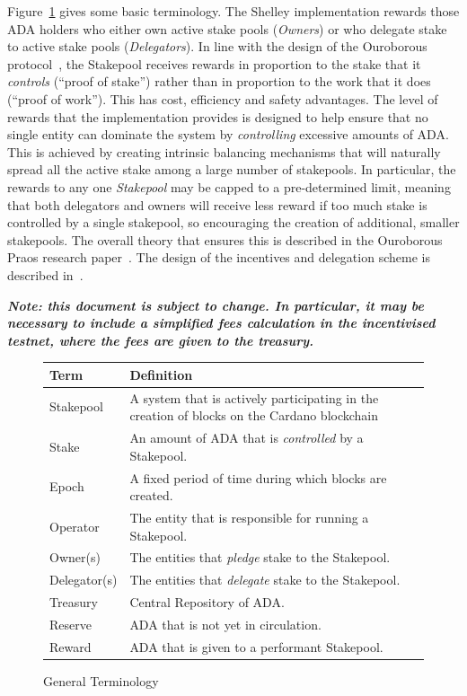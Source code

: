 \documentclass[11pt,a4paper,dvipsnames,twosided,final]{article}
\newcommand{\khcomment}[1]{\todo[color=blue!20]{KH: #1}}
\newcommand{\ada}{ADA{}}
\newcommand{\cardano}[1]{Cardano}
\begin{document}
Figure~\ref{fig:terminology} gives some basic terminology.
The Shelley implementation rewards those \ada{} holders who either own active stake pools
(\emph{Owners}) or who delegate stake to active stake pools (\emph{Delegators}).
In line with the design of the Ouroborous protocol~\cite{ouroboros_classic}, the Stakepool receives
rewards in proportion to the stake that it \emph{controls} (``proof of
stake'') rather than in proportion to the work that it does (``proof of work'').
This has cost, efficiency and safety advantages.
The level of rewards that the implementation provides is designed to help ensure that no single entity can
dominate the system by \emph{controlling} excessive amounts of \ada{}.  This is achieved by creating intrinsic
balancing mechanisms that will naturally spread all the active stake among a large number of stakepools.
In particular, the rewards to any one \emph{Stakepool} may be capped to a pre-determined limit,
meaning that both delegators and owners will receive less reward if too much stake is controlled by a single stakepool,
so encouraging the creation of additional, smaller stakepools.
The overall theory that ensures this is described in the Ouroborous Praos research
paper~\cite{ouroboros_praos}. The design of the incentives and delegation scheme is described
in~\cite{delegation_design}.

\textbf{\emph{Note: this document is subject to change.  In particular, it may be necessary to include a simplified fees calculation
  in the incentivised testnet, where the fees are given to the treasury\khcomment{Check fees.}.}}

\begin{figure}[t]
  \begin{center}
\begin{tabular}{||l|p{12cm}||}
  \hline \hline
\textbf{Term} & \textbf{Definition} \\\hline
  Stakepool & A system that is actively participating in the creation of blocks on the \cardano{} blockchain  \\\hline
  Stake & An amount of \ada{} that is \emph{controlled} by a Stakepool.\\\hline
  Epoch & A fixed period of time during which blocks are created.\\\hline
Operator & The entity that is responsible for running a Stakepool. \\\hline
Owner(s) & The entities that \emph{pledge} stake to the Stakepool. \\\hline
  Delegator(s) & The entities that \emph{delegate} stake to the Stakepool.\\\hline
  Treasury & Central Repository of \ada.\\\hline
  Reserve & \ada{} that is not yet in circulation.\\\hline
  Reward & \ada{} that is given to a performant Stakepool.\\\hline
  \hline
\end{tabular}
\end{center}
\caption{General Terminology}
\label{fig:terminology}
\end{figure}
\end{document}
